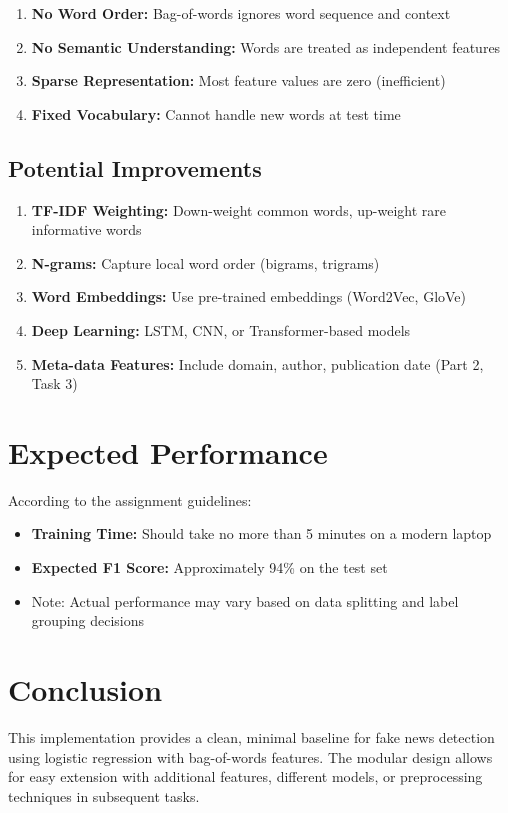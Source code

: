 \documentclass[11pt,a4paper]{article}
\begin{document}
\begin{enumerate}
    \item \textbf{No Word Order:} Bag-of-words ignores word sequence and context
    \item \textbf{No Semantic Understanding:} Words are treated as independent features
    \item \textbf{Sparse Representation:} Most feature values are zero (inefficient)
    \item \textbf{Fixed Vocabulary:} Cannot handle new words at test time
\end{enumerate}

\subsection{Potential Improvements}

\begin{enumerate}
    \item \textbf{TF-IDF Weighting:} Down-weight common words, up-weight rare informative words
    \item \textbf{N-grams:} Capture local word order (bigrams, trigrams)
    \item \textbf{Word Embeddings:} Use pre-trained embeddings (Word2Vec, GloVe)
    \item \textbf{Deep Learning:} LSTM, CNN, or Transformer-based models
    \item \textbf{Meta-data Features:} Include domain, author, publication date (Part 2, Task 3)
\end{enumerate}

\section{Expected Performance}

According to the assignment guidelines:
\begin{itemize}
    \item \textbf{Training Time:} Should take no more than 5 minutes on a modern laptop
    \item \textbf{Expected F1 Score:} Approximately 94\% on the test set
    \item Note: Actual performance may vary based on data splitting and label grouping decisions
\end{itemize}

\section{Conclusion}

This implementation provides a clean, minimal baseline for fake news detection using logistic regression with bag-of-words features. The modular design allows for easy extension with additional features, different models, or preprocessing techniques in subsequent tasks.
\end{document}
